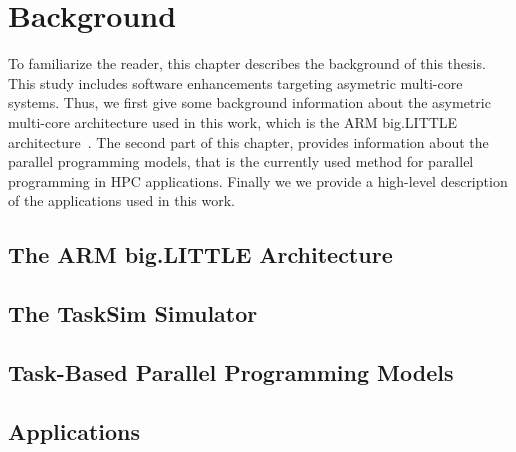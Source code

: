 \chapter{Background}
\label{chapter.background}
To familiarize the reader, this chapter describes the background of this thesis. 
This study includes software enhancements targeting asymetric multi-core systems.
Thus, we first give some background information about the asymetric multi-core architecture used in this work, which is the ARM big.LITTLE architecture~\cite{Greenhalgh2011}.
The second part of this chapter, provides information about the parallel programming models, that is the currently used method for parallel programming in HPC applications.
Finally we we provide a high-level description of the applications used in this work.
\newpage
\section{The ARM big.LITTLE Architecture}
\label{sec.background.arm}


\section{The TaskSim Simulator}
\label{sec.background.simulation}


\section{Task-Based Parallel Programming Models}
\label{sec.background.taskbased}


\section{Applications}
\label{sec.background.applications}


